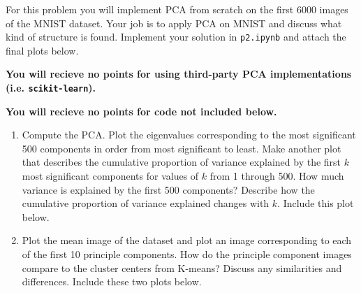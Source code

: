 \documentclass[submit]{harvardml}
\begin{document}
\newpage

\begin{problem}

% 
% 

  
For this problem you will implement PCA from scratch on the first 6000 images of the MNIST dataset. Your job is to apply PCA on MNIST and discuss what kind of structure is found. Implement your solution in \texttt{p2.ipynb} and attach the final plots below.

{\bfseries You will recieve no points for using third-party PCA implementations (i.e. {\normalfont \texttt{scikit-learn}}).}

{\bfseries You will recieve no points for code not included below.}
\begin{enumerate}

\item Compute the PCA. Plot the eigenvalues corresponding to the most
  significant 500 components in order from most significant to
  least. Make another plot that describes the cumulative proportion of
  variance explained by the first $k$ most significant components for
  values of $k$ from 1 through 500.  How much variance is explained by
  the first 500 components?  Describe how the cumulative proportion of
  variance explained changes with $k$.  Include this plot below.

\item Plot the mean image of the dataset and plot an image
  corresponding to each of the first 10 principle components.  How do
  the principle component images compare to the cluster centers from
  K-means? Discuss any similarities and differences.  Include these
  two plots below.


\end{enumerate}
\end{problem}
\end{document}
